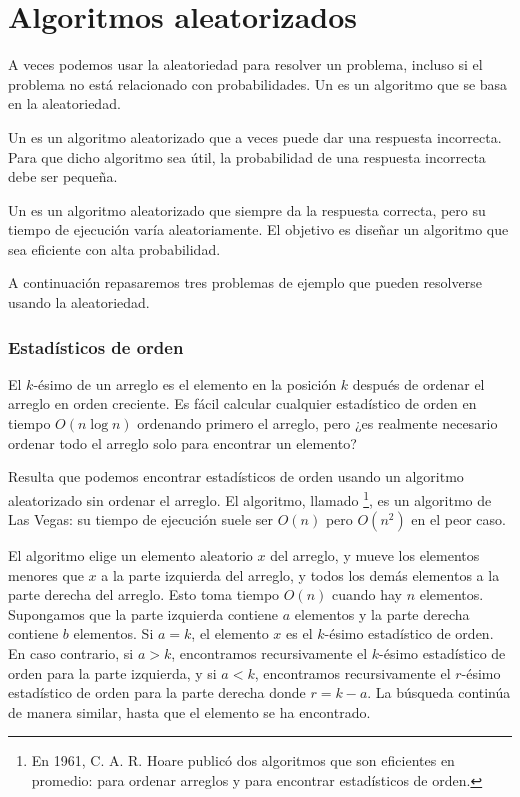 \section{Algoritmos aleatorizados}


A veces podemos usar la aleatoriedad para resolver un problema,
incluso si el problema no está relacionado con probabilidades.
Un  es un algoritmo que
se basa en la aleatoriedad.


Un  es un algoritmo aleatorizado
que a veces puede dar una respuesta incorrecta.
Para que dicho algoritmo sea útil,
la probabilidad de una respuesta incorrecta debe ser pequeña.


Un  es un algoritmo aleatorizado
que siempre da la respuesta correcta,
pero su tiempo de ejecución varía aleatoriamente.
El objetivo es diseñar un algoritmo que sea
eficiente con alta probabilidad.

A continuación repasaremos tres problemas de ejemplo que
pueden resolverse usando la aleatoriedad.

\subsubsection{Estadísticos de orden}


El $k$-ésimo  de un arreglo
es el elemento en la posición $k$ después de ordenar
el arreglo en orden creciente.
Es fácil calcular cualquier estadístico de orden
en tiempo $O(n \log n)$ ordenando primero el arreglo,
pero ¿es realmente necesario ordenar todo el arreglo
solo para encontrar un elemento?

Resulta que podemos encontrar estadísticos de orden
usando un algoritmo aleatorizado sin ordenar el arreglo.
El algoritmo, llamado \footnote{En 1961,
C. A. R. Hoare publicó dos algoritmos que
son eficientes en promedio:  
 \cite{hoa61a} para ordenar arreglos y
 \cite{hoa61b} para encontrar estadísticos de orden.}, es un algoritmo de Las Vegas:
su tiempo de ejecución suele ser $O(n)$
pero $O(n^2)$ en el peor caso.

El algoritmo elige un elemento aleatorio $x$
del arreglo, y mueve los elementos menores que $x$
a la parte izquierda del arreglo,
y todos los demás elementos a la parte derecha del arreglo.
Esto toma tiempo $O(n)$ cuando hay $n$ elementos.
Supongamos que la parte izquierda contiene $a$ elementos
y la parte derecha contiene $b$ elementos.
Si $a=k$, el elemento $x$ es el $k$-ésimo estadístico de orden.
En caso contrario, si $a>k$, encontramos recursivamente el $k$-ésimo estadístico
de orden para la parte izquierda,
y si $a<k$, encontramos recursivamente el $r$-ésimo estadístico
de orden para la parte derecha donde $r=k-a$.
La búsqueda continúa de manera similar, hasta que el elemento
se ha encontrado.

